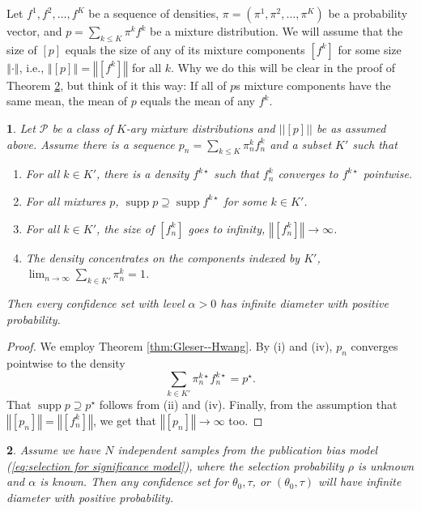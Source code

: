 \documentclass[article]{ajs}
\numberwithin{equation}{section}
\numberwithin{figure}{section}
\theoremstyle{plain}
\newtheorem{thm}{\protect\theoremname}
\theoremstyle{definition}
\theoremstyle{definition}
\theoremstyle{plain}
\newtheorem{lem}[thm]{\protect\lemmaname}
\providecommand{\lemmaname}{Lemma}
\providecommand{\theoremname}{Theorem}
\DeclareMathOperator{\supp}{supp}
\begin{document}
Let $f^{1},f^{2},\ldots,f^{K}$ be a sequence of densities, $\pi=(\pi^{1},\pi^{2},\ldots,\pi^{K})$
be a probability vector, and $p=\sum_{k\leq K}\pi^{k}f^{k}$ be a mixture distribution. We will assume that the size of $[p]$ equals the size of any of its mixture components $[f^{k}]$ for some size $\left\Vert \cdot\right\Vert $,
i.e., $\left\Vert [p]\right\Vert =\left\Vert [f^{k}]\right\Vert $
for all $k$. Why we do this will be clear in the proof of Theorem
\ref{thm:general publication bias}, but think of it this way: If
all of $p$s mixture components have the same mean, the mean of $p$
equals the mean of any $f^{k}$. 
\begin{lem}
\label{prop:Mixture model corollary} Let $\mathcal{P}$ be a class
of $K$-ary mixture distributions and $||[p]||$ be as assumed above. Assume there is a sequence $p_{n}=\sum_{k\leq K}\pi_{n}^{k}f_{n}^{k}$
and a subset $K'$ such that 
\begin{enumerate}
\item For all $k\in K'$, there is a density $f^{k\star}$ such that $f_{n}^{k}$
converges to $f^{k\star}$ pointwise.
\item For all mixtures $p$, $\supp p\supseteq\supp f^{k\star}$ for some
$k\in K'$.
\item For all $k\in K'$, the size of $[f_{n}^{k}]$ goes to infinity, $\left\Vert [f_{n}^{k}]\right\Vert \to\infty$.
\item The density concentrates on the components indexed by $K'$, $\lim_{n\to\infty}\sum_{k\in K'}\pi_{n}^{k}=1$.
\end{enumerate}
Then every confidence set with level $\alpha>0$ has infinite diameter
with positive probability.
\end{lem}

\begin{proof}
We employ Theorem \ref{thm:Gleser--Hwang}. By (i) and (iv), $p_{n}$
converges pointwise to the density $$\sum_{k\in K'}\pi_{n}^{k\star}f_{n}^{k\star}=p^{\star}.$$
That $\supp p\supseteq p^{\star}$ follows from (ii) and (iv). Finally,
from the assumption that$\left\Vert [p_{n}]\right\Vert =\left\Vert [f_{n}^{k}]\right\Vert $,
we get that $\left\Vert [p_{n}]\right\Vert \to\infty$ too. 
\end{proof}
\begin{thm}
\label{thm:general publication bias} Assume we have $N$ independent samples from the publication bias model (\ref{eq:selection for significance model}), where the selection probability $\rho$ is unknown and $\alpha$ is known. Then any confidence set for $\theta_{0},\tau$, or $(\theta_{0},\tau)$ will have infinite diameter with positive probability.
\end{thm}
\end{document}

